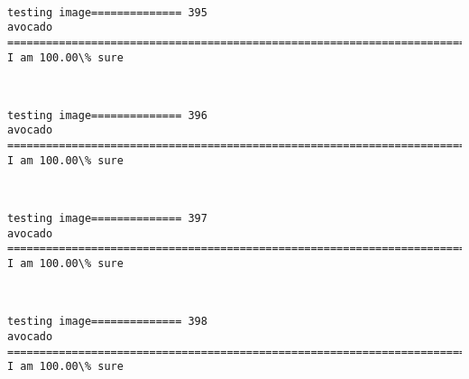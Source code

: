 \documentclass[11pt]{article}
\begin{document}
    \begin{center}
    \end{center}
    { \hspace*{\fill} \\}
    
    \begin{Verbatim}[commandchars=\\\{\}]
testing image============== 395
avocado
============================================================================
I am 100.00\% sure

    \end{Verbatim}

    \begin{center}
    \end{center}
    { \hspace*{\fill} \\}
    
    \begin{Verbatim}[commandchars=\\\{\}]
testing image============== 396
avocado
============================================================================
I am 100.00\% sure

    \end{Verbatim}

    \begin{center}
    \end{center}
    { \hspace*{\fill} \\}
    
    \begin{Verbatim}[commandchars=\\\{\}]
testing image============== 397
avocado
============================================================================
I am 100.00\% sure

    \end{Verbatim}

    \begin{center}
    \end{center}
    { \hspace*{\fill} \\}
    
    \begin{Verbatim}[commandchars=\\\{\}]
testing image============== 398
avocado
============================================================================
I am 100.00\% sure

    \end{Verbatim}
\end{document}
